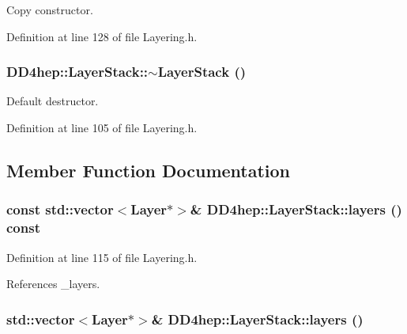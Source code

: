 Copy constructor. 

Definition at line 128 of file Layering.h.\hypertarget{class_d_d4hep_1_1_layer_stack_a945f22b1f52e382128b80e16f56f68fa}{
\subsubsection[{$\sim$LayerStack}]{\setlength{\rightskip}{0pt plus 5cm}DD4hep::LayerStack::$\sim$LayerStack ()}}
\label{class_d_d4hep_1_1_layer_stack_a945f22b1f52e382128b80e16f56f68fa}


Default destructor. 

Definition at line 105 of file Layering.h.

\subsection{Member Function Documentation}
\hypertarget{class_d_d4hep_1_1_layer_stack_af832442ae51c7e8286c43040ba127a7e}{
\subsubsection[{layers}]{\setlength{\rightskip}{0pt plus 5cm}const std::vector$<${\bf Layer}$\ast$$>$\& DD4hep::LayerStack::layers () const}}
\label{class_d_d4hep_1_1_layer_stack_af832442ae51c7e8286c43040ba127a7e}


Definition at line 115 of file Layering.h.

References \_\-layers.\hypertarget{class_d_d4hep_1_1_layer_stack_a66ac953919c08520ef1aa9da93f5aa1b}{
\subsubsection[{layers}]{\setlength{\rightskip}{0pt plus 5cm}std::vector$<${\bf Layer}$\ast$$>$\& DD4hep::LayerStack::layers ()}}
\label{class_d_d4hep_1_1_layer_stack_a66ac953919c08520ef1aa9da93f5aa1b}


